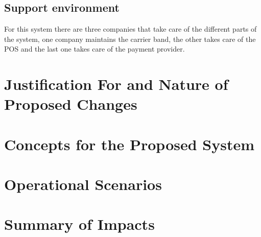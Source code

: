 \documentclass[12pt]{article}
\begin{document}
\subsection{Support environment}
For this system there are three companies that take care of the different 
parts of the system, one company maintains the carrier band, the other takes 
care of the POS and the last one takes care of the payment provider.

\pagebreak
\section{Justification For and  Nature of Proposed Changes}
\pagebreak
\section{Concepts for the Proposed System}
\pagebreak
\section{Operational Scenarios}
\pagebreak
\section{Summary of Impacts}
\end{document}
